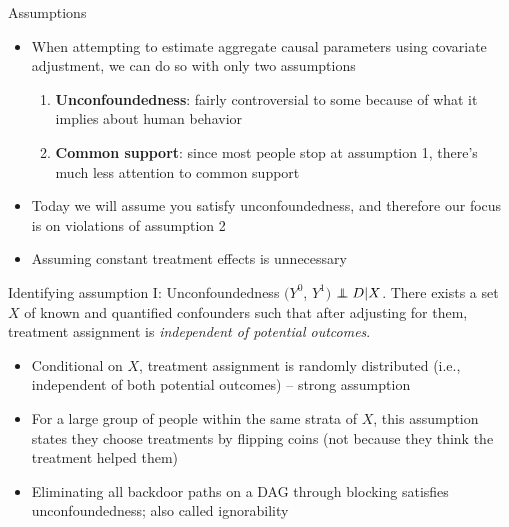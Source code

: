 \documentclass{beamer}
\newcommand\independent{\protect\mathpalette{\protect\independenT}{\perp}}
\def\independenT#1#2{\mathrel{\rlap{$#1#2$}\mkern2mu{#1#2}}}
\begin{document}
\begin{frame}{Assumptions}

\begin{itemize}

\item When attempting to estimate aggregate causal parameters using covariate adjustment, we can do so with only two assumptions

	\begin{enumerate}
	\item \textbf{Unconfoundedness}:  fairly controversial to some because of what it implies about human behavior
	\item \textbf{Common support}: since most people stop at assumption 1, there's much less attention to common support
	\end{enumerate}
\item Today we will assume you satisfy unconfoundedness, and therefore our focus is on violations of assumption 2
\item Assuming constant treatment effects is unnecessary
\end{itemize}

\end{frame}


\begin{frame}[plain]

	\begin{block}{Identifying assumption I: Unconfoundedness}
	$(Y^0$, $Y^1)$ $\independent{D} | X$. There exists a set $X$ of known and quantified confounders such that after adjusting for them, treatment assignment is \emph{independent of potential outcomes}.
	\end{block}
	
	\begin{itemize}
	\item Conditional on $X$, treatment assignment is randomly distributed (i.e., independent of both potential outcomes) -- strong assumption
	\item For a large group of people within the same strata of $X$, this assumption states they choose treatments by flipping coins (not because they think the treatment helped them)
	\item Eliminating all backdoor paths on a DAG through blocking satisfies unconfoundedness; also called ignorability
	\end{itemize}
\end{frame}
\end{document}
